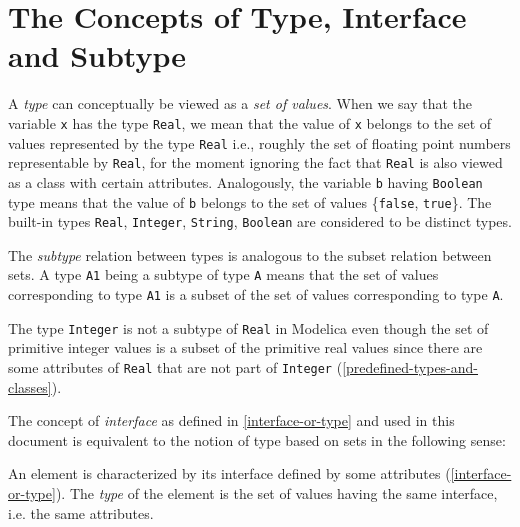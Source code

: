 \section{The Concepts of Type, Interface and Subtype}

A \emph{type} can conceptually be viewed as a \emph{set of values}. When
we say that the variable \lstinline[basicstyle=\ttfamily]!x! has the type \lstinline[basicstyle=\ttfamily]!Real!, we mean that the value of
\lstinline[basicstyle=\ttfamily]!x! belongs to the set of values represented by the type \lstinline[basicstyle=\ttfamily]!Real! i.e.,
roughly the set of floating point numbers representable by \lstinline[basicstyle=\ttfamily]!Real!, for the
moment ignoring the fact that \lstinline[basicstyle=\ttfamily]!Real! is also viewed as a class with
certain attributes. Analogously, the variable \lstinline[basicstyle=\ttfamily]!b! having \lstinline[basicstyle=\ttfamily]!Boolean! type
means that the value of \lstinline[basicstyle=\ttfamily]!b! belongs to the set of values \{\lstinline[basicstyle=\ttfamily]!false!, \lstinline[basicstyle=\ttfamily]!true!\}.
The built-in types \lstinline[basicstyle=\ttfamily]!Real!, \lstinline[basicstyle=\ttfamily]!Integer!, \lstinline[basicstyle=\ttfamily]!String!, 
\lstinline[basicstyle=\ttfamily]!Boolean! are considered to be
distinct types.

The \emph{subtype} relation between types is analogous to the subset
relation between sets. A type \lstinline[basicstyle=\ttfamily]!A1! being a subtype of type \lstinline[basicstyle=\ttfamily]!A! means that
the set of values corresponding to type \lstinline[basicstyle=\ttfamily]!A1! is a subset of the set of
values corresponding to type \lstinline[basicstyle=\ttfamily]!A!.

The type \lstinline[basicstyle=\ttfamily]!Integer! is not a subtype of \lstinline[basicstyle=\ttfamily]!Real! in Modelica even though the
set of primitive integer values is a subset of the primitive real values
since there are some attributes of \lstinline[basicstyle=\ttfamily]!Real! that are not part of \lstinline[basicstyle=\ttfamily]!Integer!
(\autoref{predefined-types-and-classes}).

The concept of \emph{interface} as defined in \autoref{interface-or-type} and used in
this document is equivalent to the notion of type based on sets in the
following sense:

An element is characterized by its interface defined by some attributes
(\autoref{interface-or-type}). The \emph{type} of the element is the set of values
having the same interface, i.e. the same attributes.

